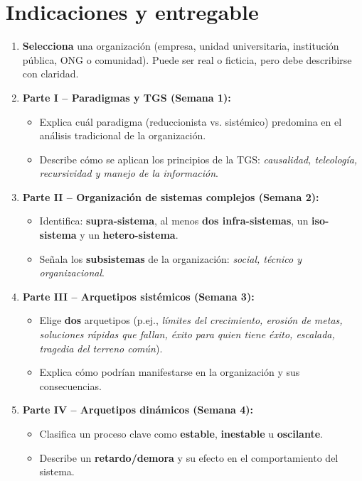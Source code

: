 \documentclass[11pt,a4paper]{article}
\begin{document}
\section*{Indicaciones y entregable}
\begin{enumerate}
  \item \textbf{Selecciona} una organización (empresa, unidad universitaria, institución pública, ONG o comunidad). Puede ser real o ficticia, pero debe describirse con claridad.
  \item \textbf{Parte I -- Paradigmas y TGS (Semana 1):}
  \begin{itemize}
    \item Explica cuál paradigma (reduccionista vs. sistémico) predomina en el análisis tradicional de la organización.
    \item Describe cómo se aplican los principios de la TGS: \emph{causalidad, teleología, recursividad y manejo de la información}.
  \end{itemize}
  \item \textbf{Parte II -- Organización de sistemas complejos (Semana 2):}
  \begin{itemize}
    \item Identifica: \textbf{supra-sistema}, al menos \textbf{dos infra-sistemas}, un \textbf{iso-sistema} y un \textbf{hetero-sistema}.
    \item Señala los \textbf{subsistemas} de la organización: \emph{social, técnico y organizacional}.
  \end{itemize}
  \item \textbf{Parte III -- Arquetipos sistémicos (Semana 3):}
  \begin{itemize}
    \item Elige \textbf{dos} arquetipos (p.ej., \emph{límites del crecimiento, erosión de metas, soluciones rápidas que fallan, éxito para quien tiene éxito, escalada, tragedia del terreno común}).
    \item Explica cómo podrían manifestarse en la organización y sus consecuencias.
  \end{itemize}
  \item \textbf{Parte IV -- Arquetipos dinámicos (Semana 4):}
  \begin{itemize}
    \item Clasifica un proceso clave como \textbf{estable}, \textbf{inestable} u \textbf{oscilante}.
    \item Describe un \textbf{retardo/demora} y su efecto en el comportamiento del sistema.
  \end{itemize}

\end{enumerate}
\end{document}
